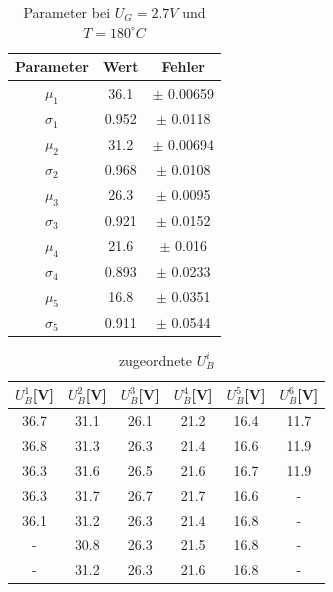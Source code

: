 \documentclass{article}
\begin{document}
\begin{multicols}{2}
\begin{table}[H]
  \centering
  \begin{tabular}{|c|c|c|}
      \hline
      Parameter & Wert & Fehler  \\ \hline
      $\mu_1$ & 36.1 & $\pm$ 0.00659 \\ \hline
      $\sigma_1$ & 0.952 & $\pm$ 0.0118 \\ \hline
      $\mu_2$ & 31.2 & $\pm$ 0.00694 \\ \hline
      $\sigma_2$ & 0.968 & $\pm$ 0.0108 \\ \hline
      $\mu_3$ & 26.3 & $\pm$ 0.0095 \\ \hline
      $\sigma_3$ & 0.921 & $\pm$ 0.0152 \\ \hline
      $\mu_4$ & 21.6 & $\pm$ 0.016 \\ \hline
      $\sigma_4$ & 0.893 & $\pm$ 0.0233 \\ \hline
      $\mu_5$ & 16.8 & $\pm$ 0.0351 \\ \hline
      $\sigma_5$ & 0.911 & $\pm$ 0.0544 \\ \hline
  \end{tabular}
  \caption{Parameter bei $U_G=2.7V$ und $T=180^\circ C$}
  \label{tab:data_no_height_8}
\end{table}

\begin{table}[H]
  \centering
  \begin{tabular}{cccccc} 
      \hline
      $U^1_B$[V] & $U^2_B$[V] & $U^3_B$[V] & $U^4_B$[V] & $U^5_B$[V] & $U^6_B$[V] \\ \hline
      36.7 & 31.1 & 26.1 & 21.2 & 16.4 & 11.7 \\ \hline
      36.8 & 31.3 & 26.3 & 21.4 & 16.6 & 11.9 \\ \hline
      36.3 & 31.6 & 26.5 & 21.6 & 16.7 & 11.9 \\ \hline
      36.3 & 31.7 & 26.7 & 21.7 & 16.6 & - \\ \hline
      36.1 & 31.2 & 26.3 & 21.4 & 16.8 & - \\ \hline
      - & 30.8 & 26.3 & 21.5 & 16.8 & - \\ \hline
      - & 31.2 & 26.3 & 21.6 & 16.8 & - \\ \hline
  \end{tabular}
  \caption{zugeordnete $U^i_B$}
  \label{tab:measurements}
\end{table}


\end{multicols}
\end{document}
